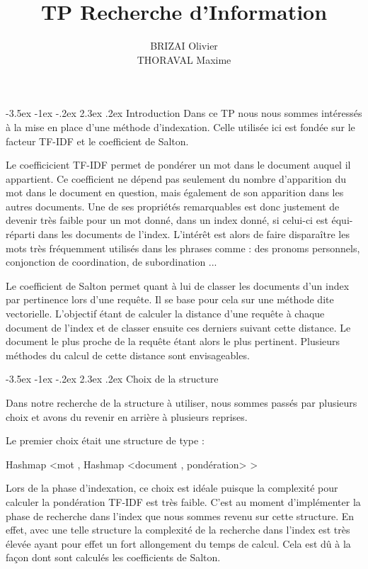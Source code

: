 \documentclass[a4paper,12pt]{article}
\makeatletter
\renewcommand\section{\@startsection {section}{1}{\z@}%
                           {-3.5ex \@plus -1ex \@minus -.2ex}%
                           {2.3ex \@plus.2ex}%
                           {\normalfont\Large\bfseries}}
\makeatother
\begin{document}
\newpage
\title{TP Recherche d'Information}
\date{}
\author{BRIZAI Olivier\\THORAVAL Maxime}
\maketitle

\newpage
\section{Introduction}
Dans ce TP nous nous sommes intéressés à la mise en place d'une méthode d'indexation. Celle utilisée ici est fondée sur le facteur TF-IDF et le coefficient de Salton.

Le coefficicient TF-IDF permet de pondérer un mot dans le document auquel il appartient. Ce coefficient ne dépend pas seulement du nombre d'apparition du mot dans le document en question, mais également de
son apparition dans les autres documents. Une de ses propriétés remarquables est donc justement de devenir très faible pour un mot donné, dans un index donné, si celui-ci est équi-réparti dans les documents de l'index. L'intérêt est alors de faire \og disparaître \fg{} les mots très fréquemment utilisés dans les phrases comme : des pronoms personnels, conjonction de coordination, de subordination ...

Le coefficient de Salton permet quant à lui de classer les documents d'un index par pertinence lors d'une requête. Il se base pour cela sur une méthode dite vectorielle. L'objectif étant de calculer la \og distance \fg{} d'une requête à chaque document de l'index et de classer ensuite ces derniers suivant cette distance. Le document le plus \og proche \fg{} de la requête étant alors le plus pertinent. Plusieurs méthodes du calcul de cette distance sont envisageables.

\section{Choix de la structure}

Dans notre recherche de la structure à utiliser, nous sommes passés par plusieurs choix et avons du revenir en arrière à plusieurs reprises.

Le premier choix était une structure de type : 

Hashmap <mot , Hashmap <document , pondération> >

Lors de la phase d'indexation, ce choix est idéale puisque la complexité pour calculer la pondération TF-IDF est très faible.
C'est au moment d'implémenter la phase de recherche dans l'index que nous sommes revenu sur cette structure. En effet, avec une telle structure la complexité de la recherche dans l'index est très élevée ayant pour effet un fort allongement du temps de calcul.
Cela est dû à la façon dont sont calculés les coefficients de Salton.
\end{document}
